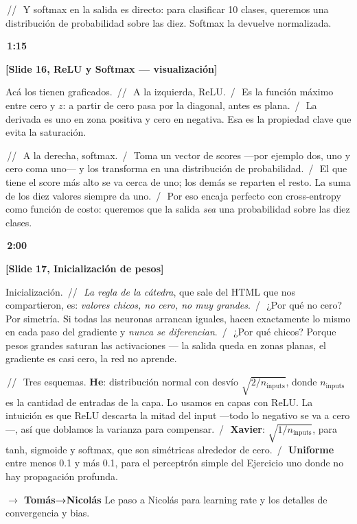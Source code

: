 \documentclass[11pt,a4paper]{article}
\newcommand{\slidenum}[1]{\textcolor{accent}{\textbf{[Slide #1]}}}
\newcommand{\timing}[1]{\textcolor{muted}{\textbf{\,#1\,}}}
\newcommand{\enunciado}[1]{\textcolor{warn}{\textit{#1}}}
\newcommand{\pausa}{\textcolor{muted}{\,/\,}}
\newcommand{\Pausa}{\textcolor{muted}{\,/\!/\,}}
\newcommand{\paso}[1]{\textcolor{accent}{\textbf{$\to$ #1}}}
\begin{document}
\Pausa\ Y softmax en la salida es directo: para clasificar 10 clases, queremos una distribución de probabilidad sobre las diez. Softmax la devuelve normalizada.

\timing{1:15}

\slidenum{16, ReLU y Softmax — visualización}

Acá los tienen graficados. \Pausa\ A la izquierda, ReLU. \pausa\ Es la función máximo entre cero y $z$: a partir de cero pasa por la diagonal, antes es plana. \pausa\ La derivada es uno en zona positiva y cero en negativa. Esa es la propiedad clave que evita la saturación.

\Pausa\ A la derecha, softmax. \pausa\ Toma un vector de scores ---por ejemplo dos, uno y cero coma uno--- y los transforma en una distribución de probabilidad. \pausa\ El que tiene el score más alto se va cerca de uno; los demás se reparten el resto. La suma de los diez valores siempre da uno. \pausa\ Por eso encaja perfecto con cross-entropy como función de costo: queremos que la salida \emph{sea} una probabilidad sobre las diez clases.

\timing{2:00}

\slidenum{17, Inicialización de pesos}

Inicialización. \Pausa\ \enunciado{La regla de la cátedra}, que sale del HTML que nos compartieron, es: \emph{valores chicos, no cero, no muy grandes}. \pausa\ ¿Por qué no cero? Por simetría. Si todas las neuronas arrancan iguales, hacen exactamente lo mismo en cada paso del gradiente y \emph{nunca se diferencian}. \pausa\ ¿Por qué chicos? Porque pesos grandes saturan las activaciones --- la salida queda en zonas planas, el gradiente es casi cero, la red no aprende.

\Pausa\ Tres esquemas. \textbf{He}: distribución normal con desvío $\sqrt{2/n_{\text{inputs}}}$, donde $n_{\text{inputs}}$ es la cantidad de entradas de la capa. Lo usamos en capas con ReLU. La intuición es que ReLU descarta la mitad del input ---todo lo negativo se va a cero---, así que doblamos la varianza para compensar. \pausa\ \textbf{Xavier}: $\sqrt{1/n_{\text{inputs}}}$, para tanh, sigmoide y softmax, que son simétricas alrededor de cero. \pausa\ \textbf{Uniforme} entre menos 0.1 y más 0.1, para el perceptrón simple del Ejercicio uno donde no hay propagación profunda.

\paso{Tomás→Nicolás} \quad Le paso a Nicolás para learning rate y los detalles de convergencia y bias.

\end{document}

